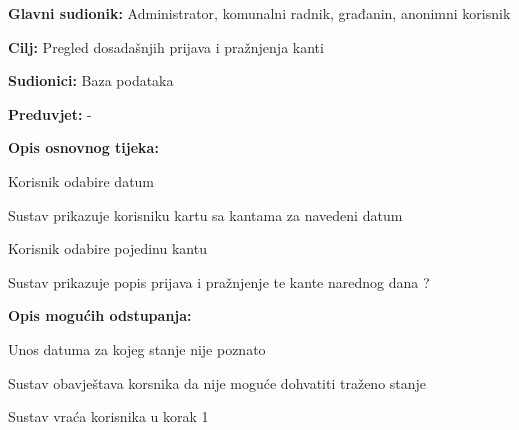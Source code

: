 				\noindent {}
					\begin{packed_item}
	
						\item \textbf{Glavni sudionik: }Administrator, komunalni radnik, građanin, anonimni korisnik
						\item  \textbf{Cilj:} Pregled dosadašnjih prijava i pražnjenja kanti
						\item  \textbf{Sudionici:} Baza podataka
						\item  \textbf{Preduvjet:} -
						\item  \textbf{Opis osnovnog tijeka:}
						
						\item[] \begin{packed_enum}
	
							\item Korisnik odabire datum
							\item Sustav prikazuje korisniku kartu sa kantama za navedeni datum
							\item Korisnik odabire pojedinu kantu
							\item Sustav prikazuje popis prijava i pražnjenje te kante narednog dana ?
						\end{packed_enum}
						
						\item  \textbf{Opis mogućih odstupanja:}
						
						\item[] \begin{packed_item}
	
							\item[1.a] Unos datuma za kojeg stanje nije poznato
							
							\item[] \begin{packed_enum}
								
								\item Sustav obavještava korsnika da nije moguće dohvatiti traženo stanje
								\item Sustav vraća korisnika u korak 1
								
							\end{packed_enum}
							
							
						\end{packed_item}
					\end{packed_item}			
				\noindent {}
